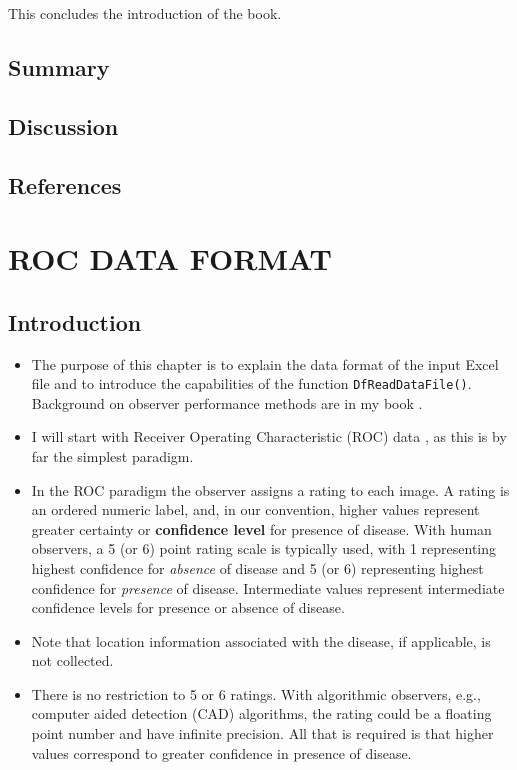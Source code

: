 \documentclass[
]{book}
\providecommand{\tightlist}{%
  \setlength{\itemsep}{0pt}\setlength{\parskip}{0pt}}
\begin{document}
This concludes the introduction of the book.

\hypertarget{preliminaries-Summary}{%
\section{Summary}\label{preliminaries-Summary}}

\hypertarget{preliminaries-Discussion}{%
\section{Discussion}\label{preliminaries-Discussion}}

\hypertarget{preliminaries-references}{%
\section{References}\label{preliminaries-references}}

\hypertarget{rocdataformat}{%
\chapter{ROC DATA FORMAT}\label{rocdataformat}}

\hypertarget{rocdataformatIntro}{%
\section{Introduction}\label{rocdataformatIntro}}

\begin{itemize}
\tightlist
\item
  The purpose of this chapter is to explain the data format of the input Excel file and to introduce the capabilities of the function \texttt{DfReadDataFile()}. Background on observer performance methods are in my book \citep{RN2680}.
\item
  I will start with Receiver Operating Characteristic (ROC) data \citep{RN1766}, as this is by far the simplest paradigm.
\item
  In the ROC paradigm the observer assigns a rating to each image. A rating is an ordered numeric label, and, in our convention, higher values represent greater certainty or \textbf{confidence level} for presence of disease. With human observers, a 5 (or 6) point rating scale is typically used, with 1 representing highest confidence for \emph{absence} of disease and 5 (or 6) representing highest confidence for \emph{presence} of disease. Intermediate values represent intermediate confidence levels for presence or absence of disease.
\item
  Note that location information associated with the disease, if applicable, is not collected.
\item
  There is no restriction to 5 or 6 ratings. With algorithmic observers, e.g., computer aided detection (CAD) algorithms, the rating could be a floating point number and have infinite precision. All that is required is that higher values correspond to greater confidence in presence of disease.
\end{itemize}
\end{document}
